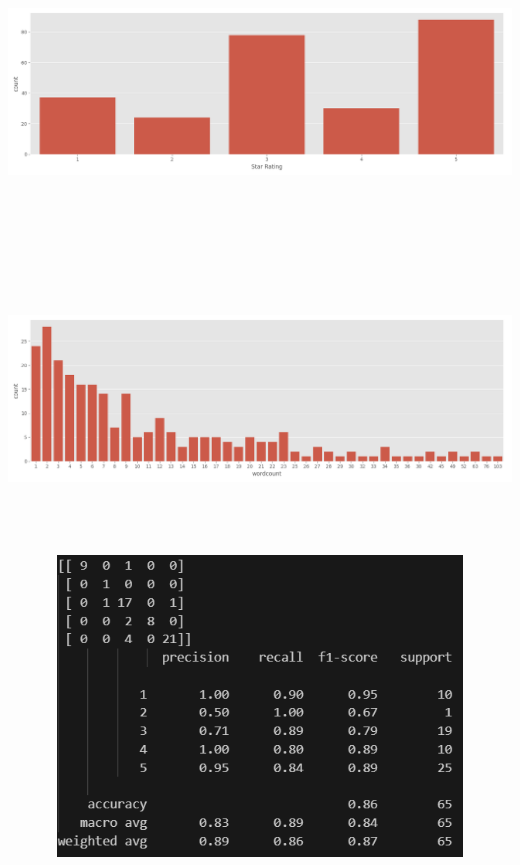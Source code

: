 \documentclass{article}
\begin{document}
\\
\includegraphics[width=14cm, height=8cm]{Figure_3.png} 
\\
\includegraphics[width=15cm, height=8cm]{Figure_2.png} 
\\
\includegraphics[width=14cm, height=8cm]{tabla4.png} 
\\
\end{document}

